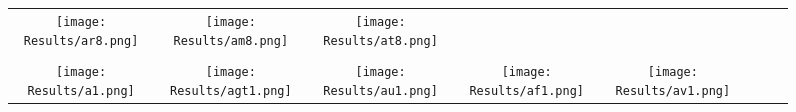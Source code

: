 \documentclass[journal]{IEEEtran}
\begin{document}
\begin{figure*}[!t]
\begin{tabular}{cccccccc}
		\hspace{0.4cm}
		\begin{minipage}{30pt}
			\texttt{[image: Results/ar8.png]}
\end{minipage}
		&
		\hspace{0.4cm}
		\begin{minipage}{30pt}
			\texttt{[image: Results/am8.png]}
\end{minipage}
		&
		\hspace{0.4cm}
		\begin{minipage}{30pt}
			\texttt{[image: Results/at8.png]}
\end{minipage}
		\\
		\\
		\begin{minipage}{30pt}
			\texttt{[image: Results/a1.png]}
\end{minipage}
		&
		\hspace{0.4cm}
		\begin{minipage}{30pt}
			\texttt{[image: Results/agt1.png]}
\end{minipage}
		&
		\hspace{0.4cm}
		\begin{minipage}{30pt}
			\texttt{[image: Results/au1.png]}
\end{minipage}
		&
		\hspace{0.4cm}
		\begin{minipage}{30pt}
			\texttt{[image: Results/af1.png]}
\end{minipage}
		&
		\hspace{0.4cm}
		\begin{minipage}{30pt}
			\texttt{[image: Results/av1.png]}
\end{minipage}
		&
	

\end{tabular}
\end{figure*}
\end{document}
